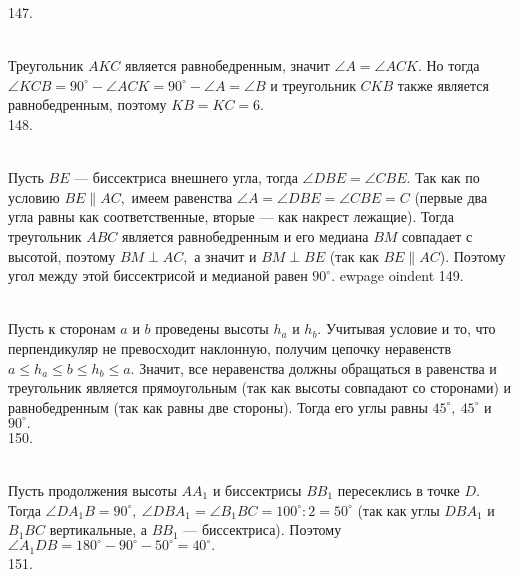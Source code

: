 147. \begin{figure}[ht!]
\end{figure}\\
Треугольник $AKC$ является равнобедренным, значит $\angle A=\angle ACK.$ Но тогда $\angle KCB=90^\circ-\angle ACK=90^\circ-\angle A=\angle B$ и треугольник $CKB$ также является равнобедренным, поэтому $KB=KC=6.$\\
148. \begin{figure}[ht!]
\end{figure}\\
Пусть $BE$ --- биссектриса внешнего угла, тогда $\angle DBE=\angle CBE.$ Так как по условию $BE\parallel AC,$ имеем равенства $\angle A=\angle DBE=\angle CBE=C$ (первые два угла равны как соответственные, вторые --- как накрест лежащие). Тогда треугольник $ABC$ является равнобедренным и его медиана $BM$ совпадает с высотой, поэтому $BM\perp AC,$ а значит и $BM\perp BE$ (так как $BE\parallel AC$). Поэтому угол между этой биссектрисой и медианой равен $90^\circ.$
ewpage
oindent
149. \begin{figure}[ht!]
\end{figure}\\
Пусть к сторонам $a$ и $b$ проведены высоты $h_a$ и $h_b.$ Учитывая условие и то, что перпендикуляр не превосходит наклонную, получим цепочку неравенств $a\leqslant h_a\leqslant b \leqslant h_b \leqslant a.$ Значит, все неравенства должны обращаться в равенства и треугольник является прямоугольным (так как высоты совпадают со сторонами) и равнобедренным (так как равны две стороны). Тогда его углы равны $45^\circ,\ 45^\circ$ и $90^\circ.$\\
150. \begin{figure}[ht!]
\end{figure}\\
Пусть продолжения высоты $AA_1$ и биссектрисы $BB_1$ пересеклись в точке $D.$ Тогда $\angle DA_1B=90^\circ,\ \angle DBA_1=\angle B_1BC=100^\circ:2=50^\circ$ (так как углы $DBA_1$ и $B_1BC$ вертикальные, а $BB_1$ --- биссектриса). Поэтому $\angle A_1DB=180^\circ-90^\circ-50^\circ=40^\circ.$\\
151.  \begin{figure}[ht!]
\end{figure}\\
